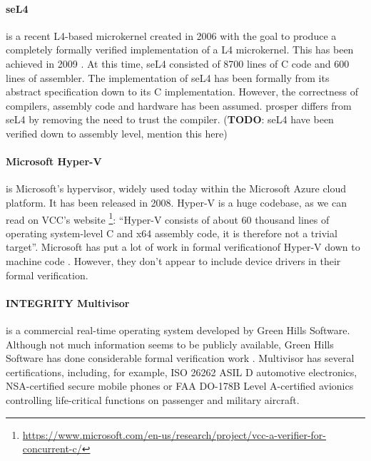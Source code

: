 \documentclass{kththesis}
\begin{document}
\paragraph{seL4} is a recent L4-based microkernel created in 2006 with the goal to produce a completely formally verified implementation of a L4 microkernel. This has been achieved in 2009 \cite{klein_sel4:_2009}. At this time, seL4 consisted of \num{8700} lines of C code and \num{600} lines of assembler. The implementation of seL4 has been formally from its abstract specification down to its C implementation. However, the correctness of compilers, assembly code and hardware has been assumed. \acrshort{prosper} differs from seL4 by removing the need to trust the compiler. (\textbf{TODO}: seL4 have been verified down to assembly level, mention this here)

\paragraph{Microsoft Hyper-V} is Microsoft's hypervisor, widely used today within the Microsoft Azure cloud platform. It has been released in 2008. Hyper-V is a huge codebase, as we can read on VCC's website \footnote{\url{https://www.microsoft.com/en-us/research/project/vcc-a-verifier-for-concurrent-c/}}: ``Hyper-V consists of about 60 thousand lines of operating system-level C and x64 assembly code, it is therefore not a trivial target''. Microsoft has put a lot of work in formal verification\footnotemark of Hyper-V down to machine code \cite{leinenbach_verifying_2009}. However, they don't appear to include device drivers in their formal verification.


\paragraph{INTEGRITY Multivisor} is a commercial real-time operating system developed by Green Hills Software. Although not much information seems to be publicly available, Green Hills Software has done considerable formal verification work \cite{richards_modeling_2010}. Multivisor has several certifications, including, for example, ISO 26262 ASIL D automotive electronics, NSA-certified secure mobile phones or FAA DO-178B Level A-certified avionics controlling life-critical functions on passenger and military aircraft\footnotemark.
\end{document}
